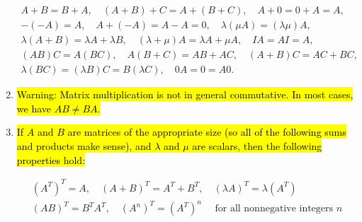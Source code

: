 \documentclass[10pt]{article}
\begin{document}
\begin{enumerate}
$$
\begin{gathered}
A+B=B+A, \quad(A+B)+C=A+(B+C), \quad A+0=0+A=A, \\
-(-A)=A, \quad A+(-A)=A-A=0, \quad \lambda(\mu A)=(\lambda \mu) A, \\
\lambda(A+B)=\lambda A+\lambda B, \quad(\lambda+\mu) A=\lambda A+\mu A, \quad I A=A I=A, \\
(A B) C=A(B C), \quad A(B+C)=A B+A C, \quad(A+B) C=A C+B C, \\
\lambda(B C)=(\lambda B) C=B(\lambda C), \quad 0 A=0=A 0 .
\end{gathered}
$$

\item \hl{Warning: Matrix multiplication is not in general commutative. In most cases, we have $A B \neq B A$.}

\item \hl{If $A$ and $B$ are matrices of the appropriate size (so all of the following sums and products make sense), and $\lambda$ and $\mu$ are scalars, then the following properties hold:}

$$
\begin{gathered}
\left(A^{T}\right)^{T}=A, \quad(A+B)^{T}=A^{T}+B^{T}, \quad(\lambda A)^{T}=\lambda\left(A^{T}\right) \\
(A B)^{T}=B^{T} A^{T}, \quad\left(A^{n}\right)^{T}=\left(A^{T}\right)^{n} \quad \text { for all nonnegative integers } n
\end{gathered}
$$
\end{enumerate}




\newpage
\end{document}
